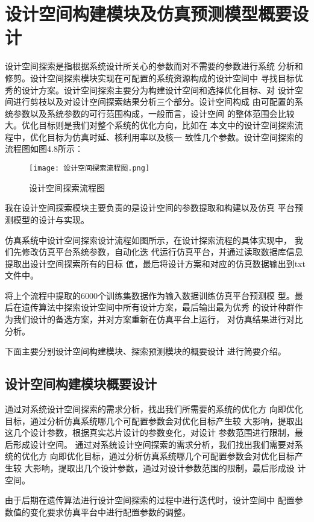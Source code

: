 \section{设计空间构建模块及仿真预测模型概要设计}
设计空间探索是指根据系统设计所关心的参数而对不需要的参数进行系统
分析和修剪。设计空间探索模块实现在可配置的系统资源构成的设计空间中
寻找目标优秀的设计方案。设计空间探索主要分为构建设计空间和选择优化目标、对
设计空间进行剪枝以及对设计空间探索结果分析三个部分。设计空间构成
由可配置的系统参数以及系统参数的可行范围构成，一般而言，设计空间
的整体范围会比较大。优化目标则是我们对整个系统的优化方向，比如在
本文中的设计空间探索流程中，优化目标为仿真时延、核利用率以及核一
致性几个参数。设计空间探索的流程图如图4.8所示：

\begin{figure}[htb]
    \centering
    \texttt{[image: 设计空间探索流程图.png]}
    \caption{设计空间探索流程图}
    \label{fig:badge}
\end{figure}

我在设计空间探索模块主要负责的是设计空间的参数提取和构建以及仿真
平台预测模型的设计与实现。

仿真系统中设计空间探索设计流程如图所示，在设计探索流程的具体实现中，
我们先修改仿真平台系统参数，自动化迭
代运行仿真平台，并通过读取数据库信息提取出设计空间探索所有的目标
值，最后将设计方案和对应的仿真数据输出到txt文件中。

将上个流程中提取的6000个训练集数据作为输入数据训练仿真平台预测模
型。最后在遗传算法中探索设计空间中所有设计方案，最后输出最为优秀
的设计种群作为我们设计的备选方案，并对方案重新在仿真平台上运行，
对仿真结果进行对比分析。

下面主要分别设计空间构建模块、探索预测模块的概要设计
进行简要介绍。

\subsection{设计空间构建模块概要设计}
通过对系统设计空间探索的需求分析，找出我们所需要的系统的优化方
向即优化目标，通过分析仿真系统哪几个可配置参数会对优化目标产生较
大影响，提取出这几个设计参数，根据真实芯片设计的参数变化，对设计
参数范围进行限制，最后形成设计空间。
通过对系统设计空间探索的需求分析，我们找出我们需要对系统的优化方
向即优化目标，通过分析仿真系统哪几个可配置参数会对优化目标产生较
大影响，提取出几个设计参数，通过对设计参数范围的限制，最后形成设
计空间。

由于后期在遗传算法进行设计空间探索的过程中进行迭代时，设计空间中
配置参数值的变化要求仿真平台中进行配置参数的调整。

